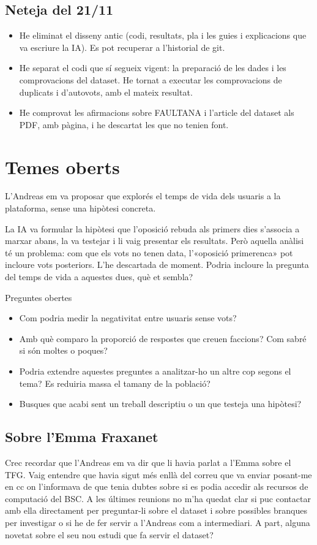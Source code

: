 \documentclass[11pt,a4paper]{article}
\begin{document}
\subsection{Neteja del 21/11}
\begin{itemize}
  \item He eliminat el disseny antic (codi, resultats, pla i les guies i explicacions que va escriure la IA). Es pot recuperar a l'historial de git.
  \item He separat el codi que sí segueix vigent: la preparació de les dades i les comprovacions del dataset. He tornat a executar les comprovacions de duplicats i d'autovots, amb el mateix resultat.
  \item He comprovat les afirmacions sobre FAULTANA i l'article del dataset als PDF, amb pàgina, i he descartat les que no tenien font.
\end{itemize}

\section{Temes oberts}

L'Andreas em va proposar que explorés el temps de vida dels usuaris a la plataforma, sense una hipòtesi concreta.

La IA va formular la hipòtesi que l'oposició rebuda als primers dies s'associa a marxar abans, la va testejar i li vaig presentar els resultats. Però aquella anàlisi té un problema: com que els vots no tenen data, l'«oposició primerenca» pot incloure vots posteriors. L'he descartada de moment. Podria incloure la pregunta del temps de vida a aquestes dues, què et sembla?

\begin{preguntes}{Preguntes obertes}
\begin{itemize}[leftmargin=1.2em]
  \item Com podria medir la negativitat entre usuaris sense vots?
  \item Amb què comparo la proporció de respostes que creuen faccions? Com sabré si són moltes o poques?
  \item Podria extendre aquestes preguntes a analitzar-ho un altre cop segons el tema? Es reduiria massa el tamany de la població?
  \item Busques que acabi sent un treball descriptiu o un que testeja una hipòtesi?
\end{itemize}
\end{preguntes}

\subsection*{Sobre l'Emma Fraxanet}
Crec recordar que l'Andreas em va dir que li havia parlat a l'Emma sobre el TFG. Vaig entendre que havia sigut més enllà del correu que va enviar posant-me en cc on l'informava de que tenia dubtes sobre si es podia accedir als recursos de computació del BSC. A les últimes reunions no m'ha quedat clar si puc contactar amb ella directament per preguntar-li sobre el dataset i sobre possibles branques per investigar o si he de fer servir a l'Andreas com a intermediari. A part, alguna novetat sobre el seu nou estudi que fa servir el dataset?
\end{document}

